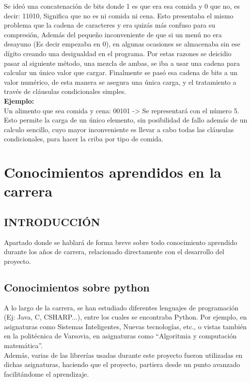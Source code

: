 Se ideó una concatenación de bits donde 1 es que era esa comida y 0 que no, es decir: 11010, Significa que no es ni comida ni cena. Esto presentaba el mismo problema que la cadena de caracteres y era quizás más confuso para su compresión, Además del pequeño inconveniente de que si un menú no era desayuno (Es decir empezaba en 0), en algunas ocasiones se almacenaba sin ese dígito creando una desigualdad en el programa. Por estas razones se deicidio pasar al siguiente método, una mezcla de ambas, se iba a usar una cadena para calcular un único valor que cargar. Finalmente se pasó esa cadena de bits a un valor numérico, de esta manera se asegura una única carga, y el tratamiento a través de cláusulas condicionales simples.\\

\textbf{Ejemplo:}\\
Un alimento que sea comida y cena: 00101 -> Se representará con el número 5. \\
Esto permite la carga de un único elemento, sin posibilidad de fallo además de un calculo sencillo, cuyo mayor inconveniente es llevar a cabo todas las cláusulas condicionales, para hacer la criba por tipo de comida.\\

\section{Conocimientos aprendidos en la carrera}
\subsection{INTRODUCCIÓN}
Apartado donde se hablará de forma breve sobre todo conocimiento aprendido durante los años de carrera, relacionado directamente con el desarrollo del proyecto.
\subsection{Conocimientos sobre python}
A lo largo de la carrera, se han estudiado diferentes lenguajes de programación (Ej: Java, C, CSHARP...), entre los cuales se encontraba Python. Por ejemplo, en asignaturas como Sistemas Inteligentes, Nuevas tecnologías, etc., o vistas también en la politécnica de Varsovia, en asignaturas como “Algoritmia y computación matemática”.\\

Además, varias de las librerías usadas durante este proyecto fueron utilizadas en dichas asignaturas, haciendo que el proyecto, partiera desde un punto avanzado facilitándome el aprendizaje.
